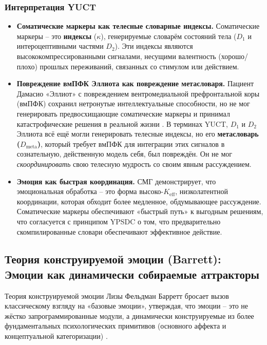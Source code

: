 \documentclass[12pt,a4paper]{article}
\begin{document}
	\subsubsection*{Интерпретация YUCT}
	\begin{itemize}
		\item \textbf{Соматические маркеры как телесные словарные индексы.} Соматические маркеры – это \textbf{индексы} (\(\kappa\)), генерируемые словарём состояний тела (\(D_1\) и интероцептивными частями \(D_2\)). Эти индексы являются высококомпрессированными сигналами, несущими валентность (хорошо/плохо) прошлых переживаний, связанных со стимулом или действием.
		\item \textbf{Повреждение вмПФК Эллиота как повреждение метасловаря.} Пациент Дамасио «Эллиот» с повреждением вентромедиальной префронтальной коры (вмПФК) сохранил нетронутые интеллектуальные способности, но не мог генерировать предвосхищающие соматические маркеры и принимал катастрофические решения в реальной жизни \cite{Damasio1994}. В терминах YUCT, \(D_1\) и \(D_2\) Эллиота всё ещё могли генерировать телесные индексы, но его \textbf{метасловарь (\(D_{\text{meta}}\))}, который требует вмПФК для интеграции этих сигналов в сознательную, действенную модель себя, был повреждён. Он не мог \textit{скоординировать} свою телесную мудрость со своим явным рассуждением.
		\item \textbf{Эмоция как быстрая координация.} СМГ демонстрирует, что эмоциональная обработка – это форма высоко-\(K_{\mathrm{eff}}\), низколатентной координации, которая обходит более медленное, обдумывающее рассуждение. Соматические маркеры обеспечивают «быстрый путь» к выгодным решениям, что согласуется с принципом YPSDC о том, что предварительно скомпилированные словари обеспечивают эффективное действие.
	\end{itemize}
	
	\subsection{Теория конструируемой эмоции (Barrett): Эмоции как динамически собираемые аттракторы}
	
	Теория конструируемой эмоции Лизы Фельдман Барретт бросает вызов классическому взгляду на «базовые эмоции», утверждая, что эмоции – это не жёстко запрограммированные модули, а динамически конструируемые из более фундаментальных психологических примитивов (основного аффекта и концептуальной категоризации) \cite{Barrett2017}.
	
\end{document}
